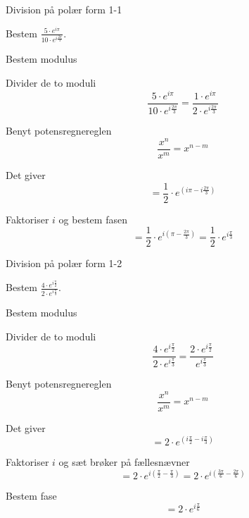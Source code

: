 \documentclass{article}
\begin{document}
\tableofcontents
\newpage

\begin{exercise}{Division på polær form 1-1}

Bestem $ \frac{5 \cdot e^{i \pi}}{10 \cdot e^{i \frac{2 \pi}{3}}}$.



\hint 

Bestem modulus


\hint

Divider de to moduli
\[
\frac{5 \cdot e^{i \pi}}{10 \cdot e^{i \frac{2 \pi}{3}}} = \frac{1 \cdot e^{i \pi}}{2 \cdot e^{i \frac{2 \pi}{3}}}
\]

\hint 

Benyt potensregnereglen
\[
\frac{x^n}{x^m} = x^{n-m}
\]

\hint

Det giver
\[
= \frac{1}{2} \cdot e^{(i \pi - i\frac{2 \pi}{3}) }
\]

\hint

Faktoriser $i$ og bestem fasen
\[
= \frac{1}{2} \cdot e^{i( \pi - \frac{2 \pi}{3})}  = \frac{1}{2} \cdot e^{i \frac{\pi}{3}}
\]


\end{exercise}

\newpage

\begin{exercise}{Division på polær form 1-2}
	
	Bestem $ \frac{4 \cdot e^{i \frac{\pi}{2}}}{2 \cdot e^{i \frac{\pi}{3}}}$.
	
	
	
	\hint 
	
	Bestem modulus
	
	
	\hint
	
	Divider de to moduli
	\[
	\frac{4 \cdot e^{i \frac{\pi}{2}}}{2 \cdot e^{i \frac{\pi}{3}}} = \frac{2 \cdot e^{i \frac{\pi}{2}}}{e^{i \frac{\pi}{3}}}
	\]
	
	\hint 
	
	Benyt potensregnereglen
	\[
	\frac{x^n}{x^m} = x^{n-m}
	\]
	
	\hint
	
	Det giver
	\[
	= 2 \cdot e^{(i \frac{\pi}{2}-i \frac{\pi}{3})}
	\]
	
	\hint
	
	Faktoriser $i$ og sæt brøker på fællesnævner
	\[
	= 2 \cdot e^{i( \frac{\pi}{2}- \frac{\pi}{3})}  = 2 \cdot e^{i( \frac{3\pi}{6}- \frac{2\pi}{6})} 	
	\]
	
	\hint
	Bestem fase
	\[
	 = 2 \cdot e^{i \frac{\pi}{6}} 	
	\]
	
\end{exercise}
\end{document}
